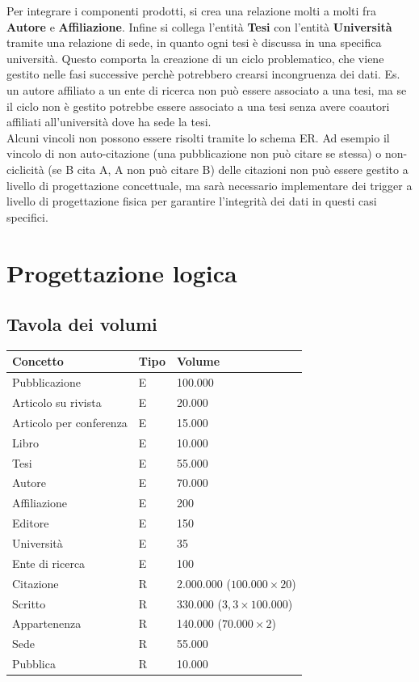 \documentclass[a4paper,12pt]{article}
\begin{document}
Per integrare i componenti prodotti, si crea una relazione molti a molti fra \textbf{Autore} e \textbf{Affiliazione}. Infine si collega l'entità \textbf{Tesi} con l'entità \textbf{Università} tramite una relazione di sede, in quanto ogni tesi è discussa in una specifica università. Questo comporta la creazione di un ciclo problematico, che viene gestito nelle fasi successive perchè potrebbero crearsi incongruenza dei dati. Es. un autore affiliato a un ente di ricerca non può essere associato a una tesi, ma se il ciclo non è gestito potrebbe essere associato a una tesi senza avere coautori affiliati all'università dove ha sede la tesi.
\\ Alcuni vincoli non possono essere risolti tramite lo schema ER. Ad esempio il vincolo di non auto-citazione (una pubblicazione non può citare se stessa) o non-ciclicità (se B cita A, A non può citare B) delle citazioni non può essere gestito a livello di progettazione concettuale, ma sarà necessario implementare dei trigger a livello di progettazione fisica per garantire l'integrità dei dati in questi casi specifici.
\section{Progettazione logica} \label{sec:progettazione-logica}
\subsection{Tavola dei volumi} \label{subsec:tavola-volumi}

\begin{tabularx}{\textwidth}{X X X}
\toprule
\textbf{Concetto} & \textbf{Tipo} & \textbf{Volume} \\
\midrule
Pubblicazione & E & 100.000 \\
Articolo su rivista & E & 20.000 \\
Articolo per conferenza & E & 15.000 \\
Libro & E & 10.000 \\
Tesi & E & 55.000 \\
Autore & E & 70.000 \\
Affiliazione & E & 200 \\
Editore & E & 150 \\
Università & E & 35 \\
Ente di ricerca & E & 100 \\
\midrule
Citazione & R & 2.000.000 ($100.000 \times 20$) \\
Scritto & R & 330.000 ($3,3 \times 100.000$) \\
Appartenenza & R & 140.000 ($70.000 \times 2$) \\
Sede & R & 55.000 \\
Pubblica & R & 10.000 \\
\bottomrule
\end{tabularx}
\end{document}
